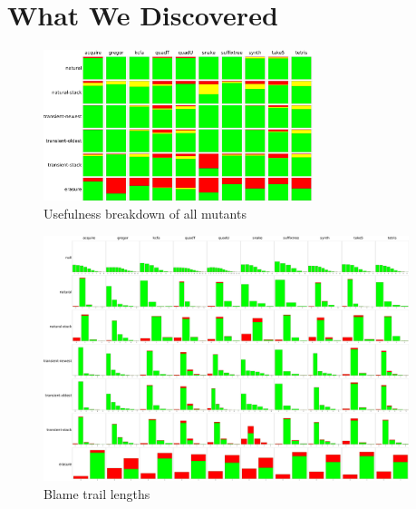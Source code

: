 \section{What We Discovered}

\begin{figure}
  \centering
  \includegraphics[width=0.7\textwidth]{./plots/usefulness-table}
  \caption{Usefulness breakdown of all mutants}
  \label{fig:usefulness-table}
\end{figure}

\begin{figure}
  \centering
  \includegraphics[width=0.95\textwidth]{./plots/bt-lengths-table}
  \caption{Blame trail lengths}
  \label{fig:usefulness-table}
\end{figure}




